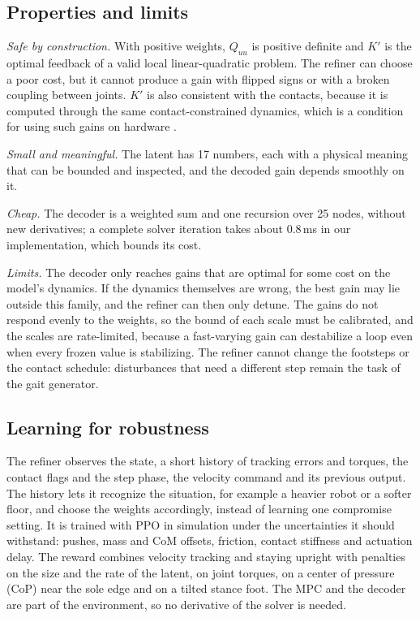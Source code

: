 \documentclass[conference]{IEEEtran}
\begin{document}
\subsection{Properties and limits}
\emph{Safe by construction.} With positive weights, $Q_{uu}$ is positive definite and $K'$ is the optimal feedback of a valid local linear-quadratic problem.
The refiner can choose a poor cost, but it cannot produce a gain with flipped signs or with a broken coupling between joints.
$K'$ is also consistent with the contacts, because it is computed through the same contact-constrained dynamics, which is a condition for using such gains on hardware \cite{grandia2019feedback}.

\emph{Small and meaningful.} The latent has 17 numbers, each with a physical meaning that can be bounded and inspected, and the decoded gain depends smoothly on it.

\emph{Cheap.} The decoder is a weighted sum and one recursion over 25 nodes, without new derivatives; a complete solver iteration takes about 0.8\,ms in our implementation, which bounds its cost.

\emph{Limits.} The decoder only reaches gains that are optimal for some cost on the model's dynamics.
If the dynamics themselves are wrong, the best gain may lie outside this family, and the refiner can then only detune.
The gains do not respond evenly to the weights, so the bound of each scale must be calibrated, and the scales are rate-limited, because a fast-varying gain can destabilize a loop even when every frozen value is stabilizing.
The refiner cannot change the footsteps or the contact schedule: disturbances that need a different step remain the task of the gait generator.

\subsection{Learning for robustness}
The refiner observes the state, a short history of tracking errors and torques, the contact flags and the step phase, the velocity command and its previous output.
The history lets it recognize the situation, for example a heavier robot or a softer floor, and choose the weights accordingly, instead of learning one compromise setting.
It is trained with PPO \cite{schulman2017ppo} in simulation under the uncertainties it should withstand: pushes, mass and CoM offsets, friction, contact stiffness and actuation delay.
The reward combines velocity tracking and staying upright with penalties on the size and the rate of the latent, on joint torques, on a center of pressure (CoP) near the sole edge and on a tilted stance foot.
The MPC and the decoder are part of the environment, so no derivative of the solver is needed.
\end{document}
